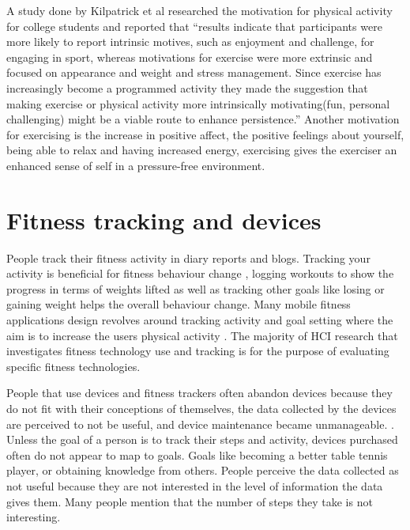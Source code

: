 A study done by Kilpatrick et al\cite{Kilpatrick} researched the motivation for physical activity for college students and reported that “results indicate that participants were more likely to report intrinsic motives, such as enjoyment and challenge, for engaging in sport,  whereas motivations for exercise were  more extrinsic and focused on appearance and weight and stress management. Since exercise has increasingly become a programmed activity \cite{Richard} they made the suggestion that making exercise or physical activity more intrinsically motivating(fun, personal challenging) might be a viable route to enhance persistence.” Another motivation for exercising is the increase in positive affect, the positive feelings about yourself, being able to relax and having increased energy, exercising gives the exerciser an enhanced sense of self in a pressure-free environment\cite{Frederick}. 

\section{Fitness tracking and devices}
People track their fitness activity in diary reports and blogs.\cite{Goodman} Tracking your activity is beneficial for fitness behaviour change \cite{mccormick2015psychological}, logging workouts to show the progress in terms of weights lifted as well as tracking other goals like losing or gaining weight helps the overall behaviour change. Many mobile fitness applications design revolves around tracking activity and goal setting where the aim is to increase the users physical activity \cite{consolvo2007conducting}. 
The majority of HCI research that investigates fitness
technology use and tracking is for the purpose of evaluating specific fitness technologies\cite{Patel2015}. 

People that use devices and fitness trackers often abandon devices because they do not fit with their conceptions of themselves, the data collected by the devices are perceived to not be useful, and device maintenance became unmanageable. \cite{Lazar2015}. Unless the goal of a person is to track their steps and activity, devices purchased often do not appear to map to goals\cite{Lazar2015}. Goals like becoming a better table tennis player, or obtaining knowledge from others. People perceive the data collected as not useful because they are not interested in the level of information the data gives them. Many people mention that the number of steps they take is not interesting\cite{Lazar2015}. 


